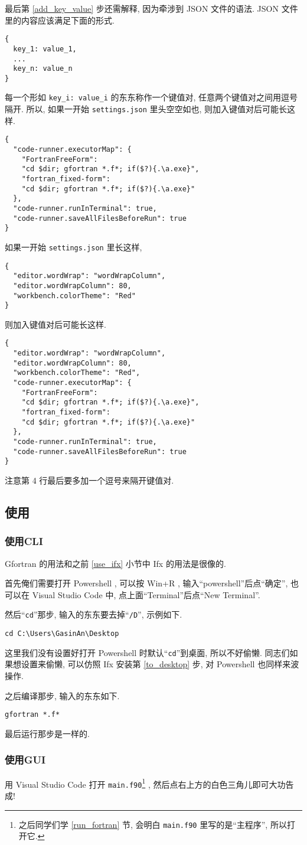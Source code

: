 最后第 \ref{add_key_value} 步还需解释, 因为牵涉到 JSON 文件的语法. JSON 文件里的内容应该满足下面的形式.
\begin{verbatim}
{
  key_1: value_1,
  ...
  key_n: value_n
}
\end{verbatim}
每一个形如 \texttt{key\_{}i: value\_{}i} 的东东称作一个键值对, 任意两个键值对之间用逗号隔开. 所以, 如果一开始 \texttt{settings.json} 里头空空如也, 则加入键值对后可能长这样.
\begin{verbatim}
{
  "code-runner.executorMap": {
    "FortranFreeForm":
    "cd $dir; gfortran *.f*; if($?){.\a.exe}",
    "fortran_fixed-form":
    "cd $dir; gfortran *.f*; if($?){.\a.exe}"
  },
  "code-runner.runInTerminal": true,
  "code-runner.saveAllFilesBeforeRun": true
}
\end{verbatim}
如果一开始 \texttt{settings.json} 里长这样,
\begin{lstlisting}
{
  "editor.wordWrap": "wordWrapColumn",
  "editor.wordWrapColumn": 80,
  "workbench.colorTheme": "Red"
}
\end{lstlisting}
则加入键值对后可能长这样.
\begin{lstlisting}
{
  "editor.wordWrap": "wordWrapColumn",
  "editor.wordWrapColumn": 80,
  "workbench.colorTheme": "Red",
  "code-runner.executorMap": {
    "FortranFreeForm":
    "cd $dir; gfortran *.f*; if($?){.\a.exe}",
    "fortran_fixed-form":
    "cd $dir; gfortran *.f*; if($?){.\a.exe}"
  },
  "code-runner.runInTerminal": true,
  "code-runner.saveAllFilesBeforeRun": true
}
\end{lstlisting}
注意第 4 行最后要多加一个逗号来隔开键值对.

\subsection{使用}\label{use_gfortran}

\subsubsection{使用CLI}

Gfortran 的用法和之前 \ref{use_ifx} 小节中 Ifx 的用法是很像的.

首先俺们需要打开 Powershell , 可以按 Win+R , 输入``powershell''后点``确定'', 也可以在 Visual Studio Code 中, 点上面``Terminal''后点``New Terminal''.

然后``\texttt{cd}''那步, 输入的东东要去掉``\texttt{/D}'', 示例如下.
\begin{verbatim}
cd C:\Users\GasinAn\Desktop
\end{verbatim}
这里我们没有设置好打开 Powershell 时默认``\texttt{cd}''到桌面, 所以不好偷懒. 同志们如果想设置来偷懒, 可以仿照 Ifx 安装第 \ref{to_desktop} 步, 对 Powershell 也同样来波操作.

之后编译那步, 输入的东东如下.
\begin{verbatim}
gfortran *.f*
\end{verbatim}

最后运行那步是一样的.

\subsubsection{使用GUI}

用 Visual Studio Code 打开 \texttt{main.f90}\footnote{之后同学们学 \ref{run_fortran} 节, 会明白 \texttt{main.f90} 里写的是``主程序'', 所以打开它.} , 然后点右上方的白色三角儿即可大功告成!
